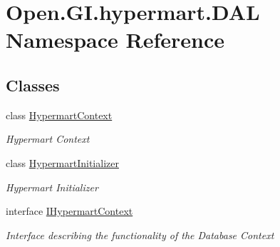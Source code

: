 \hypertarget{namespace_open_1_1_g_i_1_1hypermart_1_1_d_a_l}{}\section{Open.\+G\+I.\+hypermart.\+D\+A\+L Namespace Reference}
\label{namespace_open_1_1_g_i_1_1hypermart_1_1_d_a_l}
\subsection*{Classes}
\begin{DoxyCompactItemize}
\item 
class \hyperlink{class_open_1_1_g_i_1_1hypermart_1_1_d_a_l_1_1_hypermart_context}{Hypermart\+Context}
\begin{DoxyCompactList}\small\item\em Hypermart Context \end{DoxyCompactList}\item 
class \hyperlink{class_open_1_1_g_i_1_1hypermart_1_1_d_a_l_1_1_hypermart_initializer}{Hypermart\+Initializer}
\begin{DoxyCompactList}\small\item\em Hypermart Initializer \end{DoxyCompactList}\item 
interface \hyperlink{interface_open_1_1_g_i_1_1hypermart_1_1_d_a_l_1_1_i_hypermart_context}{I\+Hypermart\+Context}
\begin{DoxyCompactList}\small\item\em Interface describing the functionality of the Database Context \end{DoxyCompactList}\end{DoxyCompactItemize}
